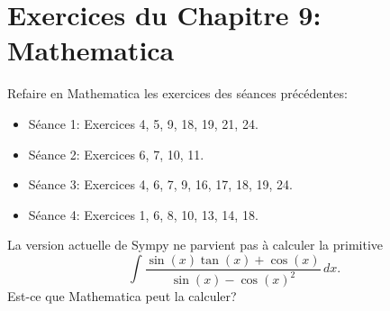 
\section*{Exercices du Chapitre 9: Mathematica}

\begin{exercice}
    Refaire en Mathematica les exercices des séances précédentes:
    \begin{itemize}
	\item Séance 1: Exercices 4, 5, 9, 18, 19, 21, 24.
	\item Séance 2: Exercices 6, 7, 10, 11.
	\item Séance 3: Exercices 4, 6, 7, 9, 16, 17, 18, 19, 24.
	\item Séance 4: Exercices 1, 6, 8, 10, 13, 14, 18.
    \end{itemize}
\end{exercice}

\begin{exercice}
    La version actuelle de Sympy ne parvient pas à calculer la primitive
    \[
	\int \frac{\sin(x)\tan(x)+\cos(x)}{\sin(x)-\cos(x)^2}\,dx.
    \]
    Est-ce que Mathematica peut la calculer?
\end{exercice}


